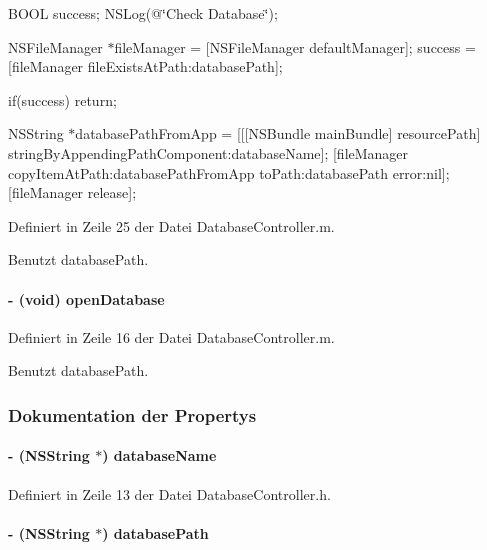 BOOL success; NSLog(@\char`\"{}Check Database\char`\"{});

NSFileManager $\ast$fileManager = \mbox{[}NSFileManager defaultManager\mbox{]}; success = \mbox{[}fileManager fileExistsAtPath:databasePath\mbox{]};

if(success) return;

NSString $\ast$databasePathFromApp = \mbox{[}\mbox{[}\mbox{[}NSBundle mainBundle\mbox{]} resourcePath\mbox{]} stringByAppendingPathComponent:databaseName\mbox{]}; \mbox{[}fileManager copyItemAtPath:databasePathFromApp toPath:databasePath error:nil\mbox{]}; \mbox{[}fileManager release\mbox{]};

Definiert in Zeile 25 der Datei DatabaseController.m.

Benutzt databasePath.\hypertarget{interface_database_controller_a017e1d00d2ab97ae34771688b2e7ecca}{
\paragraph[{openDatabase}]{\setlength{\rightskip}{0pt plus 5cm}-\/ (void) openDatabase }\hfill}
\label{interface_database_controller_a017e1d00d2ab97ae34771688b2e7ecca}


Definiert in Zeile 16 der Datei DatabaseController.m.

Benutzt databasePath.

\subsubsection{Dokumentation der Propertys}
\hypertarget{interface_database_controller_a921a7b3cf192bf2380264f18ed2896a5}{
\paragraph[{databaseName}]{\setlength{\rightskip}{0pt plus 5cm}-\/ (NSString $\ast$) databaseName}\hfill}
\label{interface_database_controller_a921a7b3cf192bf2380264f18ed2896a5}


Definiert in Zeile 13 der Datei DatabaseController.h.\hypertarget{interface_database_controller_aa593318b53fcf8cbe5b550ec7b00a6d6}{
\paragraph[{databasePath}]{\setlength{\rightskip}{0pt plus 5cm}-\/ (NSString $\ast$) databasePath}\hfill}
\label{interface_database_controller_aa593318b53fcf8cbe5b550ec7b00a6d6}



